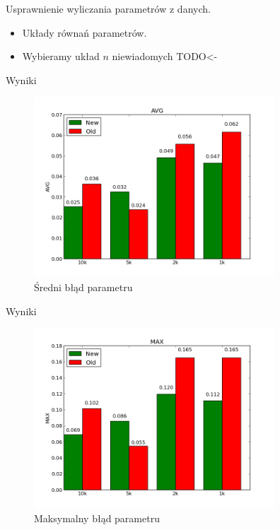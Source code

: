 \documentclass{beamer}
\begin{document}
\begin{frame}{Usprawnienie wyliczania parametrów z danych.}
	\begin{itemize}
		\item Układy równań parametrów.
		\pause \item Wybieramy układ $n$ niewiadomych TODO<-
	\end{itemize}
\end{frame}

\begin{frame}{Wyniki}
	\begin{figure}[h!]
		\centering
		\includegraphics[width=9cm]{avg.png}
		\caption{Średni błąd parametru}
	\end{figure}
\end{frame}

\begin{frame}{Wyniki}
	\begin{figure}[h!]
		\centering
		\includegraphics[width=9cm]{max.png}
		\caption{Maksymalny błąd parametru}
	\end{figure}
\end{frame}
\end{document}
